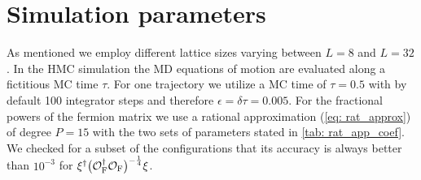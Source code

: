 \section{Simulation parameters}
As mentioned we employ different lattice sizes varying between $L=8$ and $L=32$. In the HMC simulation the MD equations of motion are evaluated along a fictitious MC time $\tau$. For one trajectory we utilize a MC time of $\tau = 0.5$ with by default 100 integrator steps and therefore $\epsilon=\delta\tau = 0.005$. For the fractional powers of the fermion matrix we use a rational approximation (\ref{eq: rat_approx}) of degree $P=15$ with the two sets of parameters stated in \autoref{tab: rat_app_coef}. We checked for a subset of the configurations that its accuracy is always better than $10^{-3}$ for $\xi^{\dagger}\big(\mathcal{O}_{\rm F}^{\dagger}\mathcal{O}_{\rm F}\big)^{-\frac{1}{4}}\xi$.
%
%
